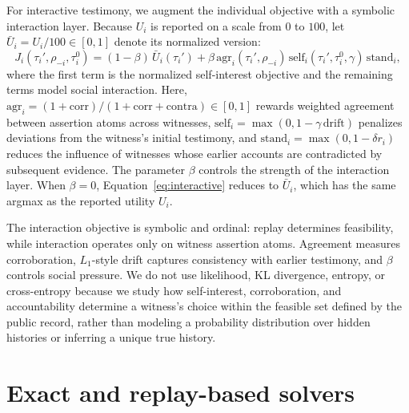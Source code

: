 \documentclass{article}
\begin{document}
For interactive testimony, we augment the individual objective with a symbolic interaction layer. Because $U_i$ is reported on a scale from $0$ to $100$, let $\bar U_i=U_i/100\in[0,1]$ denote its normalized version:
\begin{equation}
J_i(\tau_i',\rho_{-i},\tau_i^0)
=
(1-\beta)\,\bar U_i(\tau_i')
+\beta\,
\mathrm{agr}_i(\tau_i',\rho_{-i})
\,
\mathrm{self}_i(\tau_i',\tau_i^0,\gamma)
\,
\mathrm{stand}_i,
\label{eq:interactive}
\end{equation}
where the first term is the normalized self-interest objective and the remaining terms model social interaction. Here,
$\mathrm{agr}_i=(1+\mathrm{corr})/(1+\mathrm{corr}+\mathrm{contra})\in[0,1]$
rewards weighted agreement between assertion atoms across witnesses,
$\mathrm{self}_i=\max(0,1-\gamma\,\mathrm{drift})$
penalizes deviations from the witness's initial testimony,
and
$\mathrm{stand}_i=\max(0,1-\delta r_i)$
reduces the influence of witnesses whose earlier accounts are contradicted by subsequent evidence.
The parameter $\beta$ controls the strength of the interaction layer. When $\beta=0$, Equation~\ref{eq:interactive} reduces to $\bar U_i$, which has the same argmax as the reported utility $U_i$.

The interaction objective is symbolic and ordinal: replay determines feasibility, while interaction operates only on witness assertion atoms. Agreement measures corroboration, $L_1$-style drift captures consistency with earlier testimony, and $\beta$ controls social pressure. %
We do not use likelihood, KL divergence, entropy, or cross-entropy because we study how self-interest, corroboration, and accountability determine a witness's choice within the feasible set defined by the public record, rather than modeling a probability distribution over hidden histories or inferring a unique true history.

\section{Exact and replay-based solvers}
\label{sec:solvers}
\end{document}
